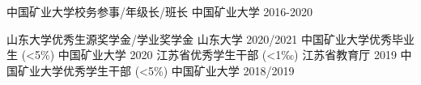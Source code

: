 
\begin{cvhonors}
    \cvhonor
      {中国矿业大学校务参事/年级长/班长} %
      {} %
      {中国矿业大学} %
      {2016-2020} %
  \end{cvhonors}


\begin{cvhonors}
  \cvhonor
  {山东大学优秀生源奖学金/学业奖学金} %
  {} %
  {山东大学} %
  {2020/2021} %
  \cvhonor
    {中国矿业大学优秀毕业生} %
    {(<5\%)} %
    {中国矿业大学} %
    {2020} %
  \cvhonor
    {江苏省优秀学生干部} %
    {(<1‰)} %
    {江苏省教育厅} %
    {2019} %
  \cvhonor
    {中国矿业大学优秀学生干部} %
    {(<5\%)} %
    {中国矿业大学} %
    {2018/2019} %
  \end{cvhonors}
